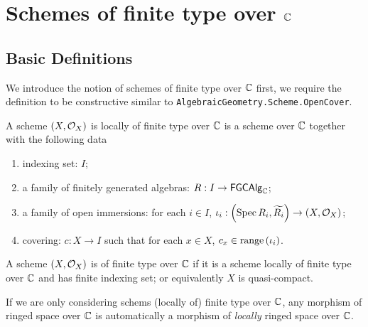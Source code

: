 

\chapter{Schemes of finite type over $\mathbb{C}$}


\section{Basic Definitions}

We introduce the notion of schemes of finite type over $\mathbb{C}$ first, we require the definition to be constructive similar
to {\tt AlgebraicGeometry.Scheme.OpenCover}.

\begin{definition}\label{def:SchemeLocallyOfFiniteType}
  A scheme $\left(X, \mathcal{O}_{X}\right)$ is locally of finite type over $\mathbb{C}$ is a scheme over $\mathbb{C}$ together
  with the following data
    \begin{enumerate}
        \item indexing set: $I$;
        \item a family of finitely generated algebras: $R : I \to \mathsf{FGCAlg}_{\mathbb{C}}$;
        \item a family of open immersions: for each $i \in I$, $\iota_i: \left(\operatorname*{Spec}{R_i}, \widetilde{R_i}\right) \to \left(X, \mathcal{O}_{X}\right)$;
        \item covering: $c : X \to I$ such that for each $x \in X$, $c_x \in \operatorname*{range}\left({\iota_i}\right)$.
    \end{enumerate}
\end{definition}


\begin{definition}\label{def:SchemeOfFiniteType}
  A scheme $\left(X, \mathcal{O}_{X}\right)$ is of finite type over $\mathbb{C}$ if it is a scheme locally of finite type over $\mathbb{C}$
  and has finite indexing set; or equivalently $X$ is quasi-compact.
\end{definition}

\begin{remark}
  If we are only considering schems (locally of) finite type over $\mathbb{C}$, any morphism of ringed space over $\mathbb{C}$ is automatically a morphism of {\em locally\/} ringed space over $\mathbb{C}$.

\end{remark}


